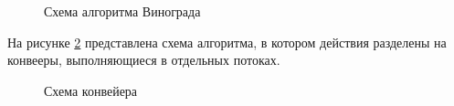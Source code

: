 \documentclass[a4paper,12pt]{article}
\begin{document}
\begin{figure}[H]
    \caption{Схема алгоритма Винограда}
    \label{img:modvinograd}
\end{figure}

На рисунке \ref{img:conveer} представлена схема алгоритма, в котором действия
разделены на конвееры, выполняющиеся в отдельных потоках.

\begin{figure}[H]
    \caption{Схема конвейера}
    \label{img:conveer}
\end{figure}
\end{document}
